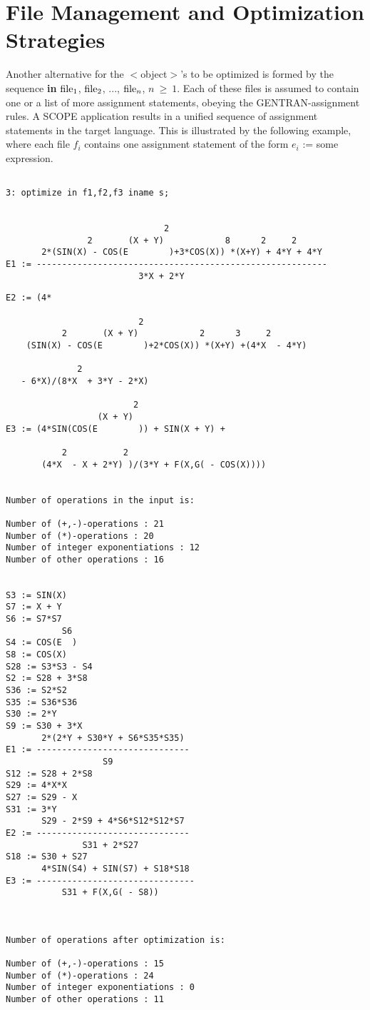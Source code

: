 \section{File Management and Optimization Strategies}\label{SCOPE:files}

Another alternative for the $<$object$>$'s to be optimized is formed
by the sequence {\bf in} ${{\rm file}}_{1}$, ${{\rm file}}_{2}$, ...,
${{\rm file}}_{n}$, $n\ \ge\ 1$.  Each of these files is assumed to
contain one or a list of more assignment statements, obeying the
GENTRAN-assignment rules.  A SCOPE application results in a unified
sequence of assignment statements in the target language. This is
illustrated by the following example, where each file $f_i$ contains one
assignment statement of the form $e_i$ := some expression.

\example\label{ex:5.1}
{\small
\begin{verbatim}

3: optimize in f1,f2,f3 iname s;


                               2
                2       (X + Y)            8      2     2
       2*(SIN(X) - COS(E        )+3*COS(X)) *(X+Y) + 4*Y + 4*Y
E1 := ---------------------------------------------------------
                          3*X + 2*Y

\end{verbatim}
\newpage
\begin{verbatim}
E2 := (4*

                          2
           2       (X + Y)            2      3     2
    (SIN(X) - COS(E        )+2*COS(X)) *(X+Y) +(4*X  - 4*Y)

              2
   - 6*X)/(8*X  + 3*Y - 2*X)

                         2
                  (X + Y)
E3 := (4*SIN(COS(E        )) + SIN(X + Y) +

           2           2
       (4*X  - X + 2*Y) )/(3*Y + F(X,G( - COS(X))))


Number of operations in the input is:

Number of (+,-)-operations : 21
Number of (*)-operations : 20
Number of integer exponentiations : 12
Number of other operations : 16


S3 := SIN(X)
S7 := X + Y
S6 := S7*S7
           S6
S4 := COS(E  )
S8 := COS(X)
S28 := S3*S3 - S4
S2 := S28 + 3*S8
S36 := S2*S2
S35 := S36*S36
S30 := 2*Y
S9 := S30 + 3*X
       2*(2*Y + S30*Y + S6*S35*S35)
E1 := ------------------------------
                   S9
S12 := S28 + 2*S8
S29 := 4*X*X
S27 := S29 - X
S31 := 3*Y
       S29 - 2*S9 + 4*S6*S12*S12*S7
E2 := ------------------------------
               S31 + 2*S27
S18 := S30 + S27
       4*SIN(S4) + SIN(S7) + S18*S18
E3 := -------------------------------
           S31 + F(X,G( - S8))



Number of operations after optimization is:

Number of (+,-)-operations : 15
Number of (*)-operations : 24
Number of integer exponentiations : 0
Number of other operations : 11

\end{verbatim}
}

